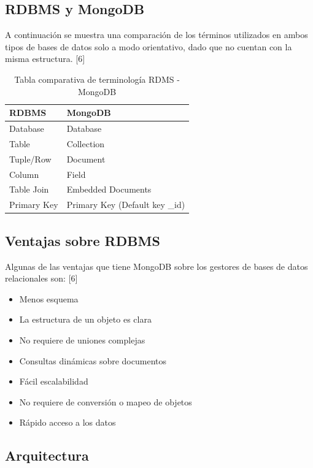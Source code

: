 \documentclass[twocolumn]{article}
\begin{document}
\subsection{RDBMS y MongoDB}

A continuación se muestra una comparación de los términos utilizados en ambos tipos de bases de datos solo a modo orientativo, dado que no cuentan con la misma estructura. [6]

\begin{table}[h]
\centering
\begin{tabular}{|l|l|}
\hline
\rowcolor[HTML]{67FD9A} 
\textbf{RDBMS} & \textbf{MongoDB}               \\ \hline
Database       & Database                       \\ \hline
Table          & Collection                     \\ \hline
Tuple/Row      & Document                       \\ \hline
Column         & Field                          \\ \hline
Table Join     & Embedded Documents             \\ \hline
Primary Key    & Primary Key (Default key \_id) \\ \hline
\end{tabular}
\caption{Tabla comparativa de terminología RDMS - MongoDB}
\end{table}

\subsection{Ventajas sobre RDBMS}

Algunas de las ventajas que tiene MongoDB sobre los gestores de bases de datos relacionales son: [6]

\begin{itemize}
  \item Menos esquema
  \item La estructura de un objeto es clara
  \item No requiere de uniones complejas
  \item Consultas dinámicas sobre documentos
  \item Fácil escalabilidad
  \item No requiere de conversión o mapeo de objetos
  \item Rápido acceso a los datos
\end{itemize}

\subsection{Arquitectura}
\end{document}
